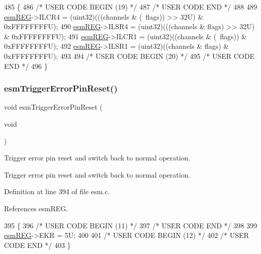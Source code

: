 \begin{DoxyCode}
485 \{
486 \textcolor{comment}{/* USER CODE BEGIN (19) */}
487 \textcolor{comment}{/* USER CODE END */}
488 
489     \mbox{\hyperlink{reg__esm_8h_a7c2e779f2973e0c2c9496a4796df10f1}{esmREG}}->ILCR4 = (uint32)(((channels & (~flags)) >> 32U) & 0xFFFFFFFFU);
490     \mbox{\hyperlink{reg__esm_8h_a7c2e779f2973e0c2c9496a4796df10f1}{esmREG}}->ILSR4 = (uint32)(((channels & flags) >> 32U) & 0xFFFFFFFFU);
491     \mbox{\hyperlink{reg__esm_8h_a7c2e779f2973e0c2c9496a4796df10f1}{esmREG}}->ILCR1 = (uint32)((channels & (~flags)) & 0xFFFFFFFFU);
492     \mbox{\hyperlink{reg__esm_8h_a7c2e779f2973e0c2c9496a4796df10f1}{esmREG}}->ILSR1 = (uint32)((channels & flags) & 0xFFFFFFFFU);
493 
494 \textcolor{comment}{/* USER CODE BEGIN (20) */}
495 \textcolor{comment}{/* USER CODE END */}
496 \}
\end{DoxyCode}
\mbox{\label{group__ESM_gaa830bed2b9fc364b96269ff0baa8c395}} 
\subsubsection{\texorpdfstring{esm\+Trigger\+Error\+Pin\+Reset()}{esmTriggerErrorPinReset()}}
{\footnotesize\ttfamily void esm\+Trigger\+Error\+Pin\+Reset (\begin{DoxyParamCaption}\item[{void}]{ }\end{DoxyParamCaption})}



Trigger error pin reset and switch back to normal operation. 

Trigger error pin reset and switch back to normal operation. 

Definition at line 394 of file esm.\+c.



References esm\+R\+EG.


\begin{DoxyCode}
395 \{
396 \textcolor{comment}{/* USER CODE BEGIN (11) */}
397 \textcolor{comment}{/* USER CODE END */}
398 
399     \mbox{\hyperlink{reg__esm_8h_a7c2e779f2973e0c2c9496a4796df10f1}{esmREG}}->EKR = 5U;
400 
401 \textcolor{comment}{/* USER CODE BEGIN (12) */}
402 \textcolor{comment}{/* USER CODE END */}
403 \}
\end{DoxyCode}
